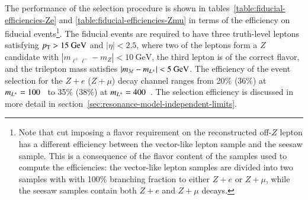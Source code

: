 The performance of the selection procedure is shown in tables~\ref{table:fiducial-efficiencies-Ze} and \ref{table:fiducial-efficiencies-Zmu} in terms of the efficiency on fiducial events\footnote{Note that cut imposing a flavor requirement on the reconstructed off-$Z$ lepton has a different efficiency between the vector-like lepton sample and the seesaw sample. This is a consequence of the flavor content of the samples used to compute the efficiencies: the vector-like lepton samples are divided into two samples with with 100\% branching fraction to either $Z+e$ or $Z+\mu$, while the seesaw samples contain both $Z+e$ and $Z+\mu$ decays.}. The fiducial events are required to have three truth-level leptons satisfying $p_{\text{T}}>15~\mbox{GeV}$ and $|\eta|<2.5$, where two of the leptons form a $Z$ candidate with $|m_{\ell^+ \ell^-}-m_Z|<10~\mbox{GeV}$, the third lepton is of the correct flavor, and the trilepton mass satisfies $|m_{3\ell}-m_{L^{\pm}}|<5~\mbox{GeV}$. The efficiency of the event selection for the $Z+e$ ($Z+\mu$) decay channel ranges from 20\% (36\%) at $m_{L^{\pm}}=100$~\GeV{} to 35\% (38\%) at $m_{L^{\pm}}=400$~\GeV. The selection efficiency is discussed in more detail in section~\ref{sec:resonance-model-independent-limits}. %



